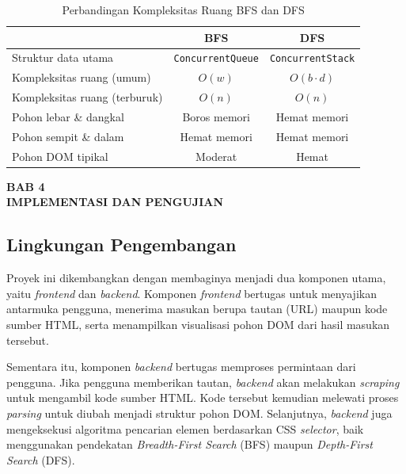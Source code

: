 \documentclass[12pt]{article}
\begin{document}
\begin{table}[H]
\begin{tabular}{|l|c|c|}
\begin{document}
\begin{table}[H]
\centering
\begin{tabular}{|l|c|c|}
\hline
\textbf{Aspek} & \textbf{BFS} & \textbf{DFS} \\ \hline
Struktur data utama & \texttt{ConcurrentQueue} & \texttt{ConcurrentStack} \\ \hline
Kompleksitas ruang (umum) & $O(w)$ & $O(b \cdot d)$ \\ \hline
Kompleksitas ruang (terburuk) & $O(n)$ & $O(n)$ \\ \hline
Pohon lebar \& dangkal & Boros memori & Hemat memori \\ \hline
Pohon sempit \& dalam & Hemat memori & Hemat memori \\ \hline
Pohon DOM tipikal & Moderat & Hemat \\ \hline
\end{tabular}
\caption{Perbandingan Kompleksitas Ruang BFS dan DFS}
\label{tab:memori}
\end{table}


\newpage
\begin{center}
    \Large\textbf{BAB 4} \\
    \vspace{0.2cm}
    \Large\textbf{IMPLEMENTASI DAN PENGUJIAN}
\end{center}
\setcounter{section}{4}
\setcounter{subsection}{0}

\subsection{Lingkungan Pengembangan}
Proyek ini dikembangkan dengan membaginya menjadi dua komponen utama, yaitu \textit{frontend} dan \textit{backend}. Komponen \textit{frontend} bertugas untuk menyajikan antarmuka pengguna, menerima masukan berupa tautan (URL) maupun kode sumber HTML, serta menampilkan visualisasi pohon DOM dari hasil masukan tersebut. 

Sementara itu, komponen \textit{backend} bertugas memproses permintaan dari pengguna. Jika pengguna memberikan tautan, \textit{backend} akan melakukan \textit{scraping} untuk mengambil kode sumber HTML. Kode tersebut kemudian melewati proses \textit{parsing} untuk diubah menjadi struktur pohon DOM. Selanjutnya, \textit{backend} juga mengeksekusi algoritma pencarian elemen berdasarkan CSS \textit{selector}, baik menggunakan pendekatan \textit{Breadth-First Search} (BFS) maupun \textit{Depth-First Search} (DFS).


\end{document}
\end{tabular}
\end{table}
\end{document}
